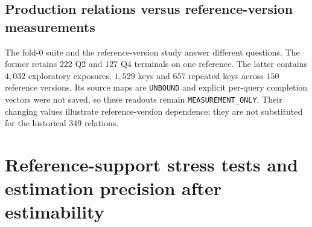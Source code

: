 \subsection{Production relations versus reference-version measurements}
The fold-0 suite and the reference-version study answer different questions. The former retains $222$ Q2 and $127$ Q4 terminals on one reference. The latter contains $4{,}032$ exploratory exposures, $1{,}529$ keys and $657$ repeated keys across $150$ reference versions. Its source maps are \texttt{UNBOUND} and explicit per-query completion vectors were not saved, so these readouts remain \texttt{MEASUREMENT\_ONLY}. Their changing values illustrate reference-version dependence; they are not substituted for the historical $349$ relations.

\par
\section{Reference-support stress tests and estimation precision after estimability}
\label{supp:graph}
